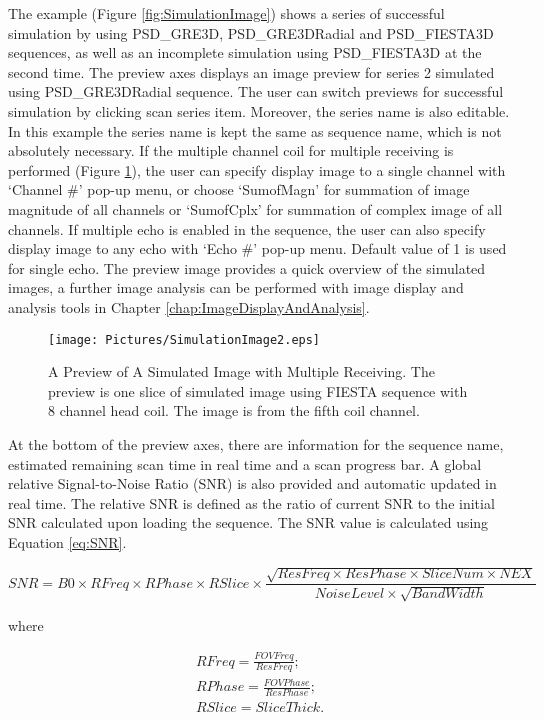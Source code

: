 \documentclass{book}%
\begin{document}
The example (Figure \ref{fig:SimulationImage}) shows a series of successful simulation by using PSD\_GRE3D, PSD\_GRE3DRadial and PSD\_FIESTA3D sequences, as well as an incomplete simulation using PSD\_FIESTA3D at the second time. The preview axes displays an image preview for series 2 simulated using PSD\_GRE3DRadial sequence. The user can switch previews for successful simulation by clicking scan series item. Moreover, the series name is also editable. In this example the series name is kept the same as sequence name, which is not absolutely necessary. If the multiple channel coil for multiple receiving is performed (Figure \ref{fig:SimulationImage2}), the user can specify display image to a single channel with `Channel \#' pop-up menu, or choose `SumofMagn' for summation of image magnitude of all channels or `SumofCplx' for summation of complex image of all channels. If multiple echo is enabled in the sequence, the user can also specify display image to any echo with `Echo \#' pop-up menu. Default value of 1 is used for single echo. The preview image provides a quick overview of the simulated images, a further image analysis can be performed with image display and analysis tools in Chapter \ref{chap:ImageDisplayAndAnalysis}.

\begin{figure}[htbp]
	\centering
		\texttt{[image: Pictures/SimulationImage2.eps]}
	\caption{A Preview of A Simulated Image with Multiple Receiving. The preview is one slice of simulated image using FIESTA sequence with 8 channel head coil. The image is from the fifth coil channel.}
	\label{fig:SimulationImage2}
\end{figure}

At the bottom of the preview axes, there are information for the sequence name, estimated remaining scan time in real time and a scan progress bar. A global relative Signal-to-Noise Ratio (SNR) is also provided and automatic updated in real time. The relative SNR is defined as the ratio of current SNR to the initial SNR calculated upon loading the sequence. The SNR value is calculated using Equation \ref{eq:SNR}.

\begin{equation}
SNR = B0 \times RFreq \times RPhase \times RSlice \times \frac{\sqrt{ResFreq \times ResPhase \times SliceNum \times NEX}}{NoiseLevel \times \sqrt{BandWidth}}
\label{eq:SNR}
\end{equation}

where

\begin{equation}
\begin{aligned}
	RFreq  = \frac{FOVFreq}{ResFreq}; \\
	RPhase = \frac{FOVPhase}{ResPhase}; \\
	RSlice = SliceThick. \\
\label{eq:SNR2}
\end{aligned}
\end{equation}
\end{document}
